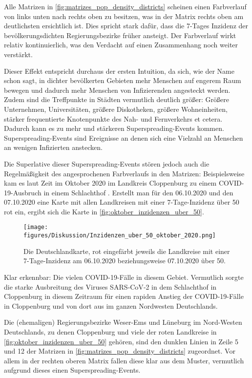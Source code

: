 Alle Matrizen in \autoref{fig:matrizes_pop_density_districts} scheinen einen Farbverlauf von links unten nach rechts oben zu besitzen, was in der Matrix rechts oben am deutlichsten ersichtlich ist. Dies spricht stark dafür, dass die 7-Tages Inzidenz der bevölkerungsdichten Regierungsbezirke früher ansteigt. Der Farbverlauf wirkt relativ kontinuierlich, was den Verdacht auf einen Zusammenhang noch weiter verstärkt.

Dieser Effekt entspricht durchaus der ersten Intuition, da sich, wie der Name schon sagt, in dichter bevölkerten Gebieten mehr Menschen auf engerem Raum bewegen und dadurch mehr Menschen von Infizierenden angesteckt werden.
Zudem sind die Treffpunkte in Städten vermutlich deutlich größer: Größere Unternehmen, Universitäten, größere Diskotheken, größere Wohneinheiten, stärker frequentierte Knotenpunkte des Nah- und Fernverkehrs et cetera. Dadurch kann es zu mehr und stärkeren Superspreading-Events kommen. Superspreading-Events sind Ereignisse an denen sich eine Vielzahl an Menschen an wenigen Infizierten anstecken.

Die Superlative dieser Superspreading-Events stören jedoch auch die Regelmäßigkeit des angesprochenen Farbverlaufs in den Matrizen: Beispielsweise kam es laut Zeit im Oktober 2020 im Landkreis Cloppenburg zu einem COVID-19-Ausbruch in einem Schlachthof \autocite{Zeitartikel}. Erstellt man für den 06.10.2020 und den 07.10.2020 eine Karte mit allen Landkreisen mit einer 7-Tage-Inzidenz über 50 rot ein, ergibt sich die Karte in \autoref{fig:oktober_inzidenzen_uber_50}.

\begin{figure}[H]
    \centering
    \texttt{[image: figures/Diskussion/Inzidenzen\_uber\_50\_oktober\_2020.png]}
    \caption{Die Deutschlandkarte, rot eingefärbt jeweils die Landkreise mit einer 7-Tage-Inzidenz am 06.10.2020 beziehungsweise 07.10.2020 über 50.}
    \label{fig:oktober_inzidenzen_uber_50}
\end{figure}
Klar erkennbar: Die vielen COVID-19-Fälle in diesem Gebiet. Vermutlich sorgte die starke Ausbreitung des Viruses SARS‑CoV‑2 in dem Schlachthof in Cloppenburg in diesem Zeitraum für einen rapiden Anstieg der COVID-19-Fälle in Cloppenburg und von dort aus im ganzen Nordwesten Deutschlands.

Die (ehemaligen) Regierungsbezirke Weser-Ems und Lüneburg im Nord-Westen Deutschlands, zu denen Cloppenburg und viele der roten Landkreise in \autoref{fig:oktober_inzidenzen_uber_50} gehören, sind den dunklen Linien in Zeile 5 und 12 der Matrizen in \autoref{fig:matrizes_pop_density_districts} zugeordnet. Vor allem in der rechten oberen Matrix fallen diese klar aus dem Muster, vermutlich aufgrund dieses einen Superspreading-Events.

